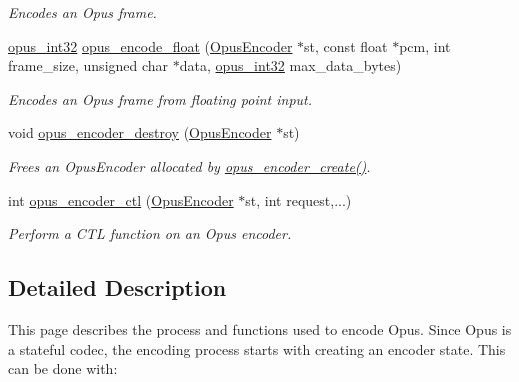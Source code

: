 \begin{DoxyCompactItemize}
\begin{DoxyCompactList}\small\item\em Encodes an Opus frame. \item\end{DoxyCompactList}\item 
\hyperlink{opus__types_8h_aa4d309d6f80b99dbabebc8f98879ab9a}{opus\_\-int32} \hyperlink{group__opus__encoder_ga4ae9905859cd241ef4bb5c59cd5e5309}{opus\_\-encode\_\-float} (\hyperlink{group__opus__encoder_gaf461a3ef2f10c2fe8b994a176f06c9bd}{OpusEncoder} $\ast$st, const float $\ast$pcm, int frame\_\-size, unsigned char $\ast$data, \hyperlink{opus__types_8h_aa4d309d6f80b99dbabebc8f98879ab9a}{opus\_\-int32} max\_\-data\_\-bytes)
\begin{DoxyCompactList}\small\item\em Encodes an Opus frame from floating point input. \item\end{DoxyCompactList}\item 
void \hyperlink{group__opus__encoder_ga5f4c05b4b51cdffec5a55dbf17bbfa1c}{opus\_\-encoder\_\-destroy} (\hyperlink{group__opus__encoder_gaf461a3ef2f10c2fe8b994a176f06c9bd}{OpusEncoder} $\ast$st)
\begin{DoxyCompactList}\small\item\em Frees an {\ttfamily OpusEncoder} allocated by \hyperlink{group__opus__encoder_gaa89264fd93c9da70362a0c9b96b9ca88}{opus\_\-encoder\_\-create()}. \item\end{DoxyCompactList}\item 
int \hyperlink{group__opus__encoder_ga164cbb0425238961919adf1db67949df}{opus\_\-encoder\_\-ctl} (\hyperlink{group__opus__encoder_gaf461a3ef2f10c2fe8b994a176f06c9bd}{OpusEncoder} $\ast$st, int request,...)
\begin{DoxyCompactList}\small\item\em Perform a CTL function on an Opus encoder. \item\end{DoxyCompactList}\end{DoxyCompactItemize}


\subsection{Detailed Description}
This page describes the process and functions used to encode Opus. Since Opus is a stateful codec, the encoding process starts with creating an encoder state. This can be done with:


